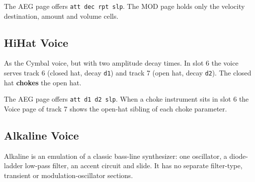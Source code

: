 The AEG page offers \texttt{att\ dec\ rpt\ slp}. The MOD page holds only
the velocity destination, amount and volume cells.

\subsection{HiHat Voice}\label{hihat-voice}

As the Cymbal voice, but with two amplitude decay times. In slot 6 the
voice serves track 6 (closed hat, decay \texttt{d1}) and track 7 (open
hat, decay \texttt{d2}). The closed hat \textbf{chokes} the open hat.


The AEG page offers \texttt{att\ d1\ d2\ slp}. When a choke instrument
sits in slot 6 the Voice page of track 7 shows the open-hat sibling of
each choke parameter.

\subsection{Alkaline Voice}\label{alkaline-voice}

Alkaline is an emulation of a classic bass-line synthesizer: one
oscillator, a diode-ladder low-pass filter, an accent circuit and slide.
It has no separate filter-type, transient or modulation-oscillator
sections.



